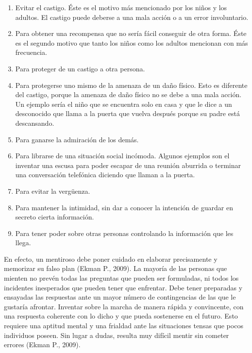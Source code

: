 \begin{enumerate}
\item Evitar el castigo. Éste es el motivo más mencionado por los niños y los adultos. El castigo puede deberse a una mala acción o a un error involuntario. 
\item Para obtener una recompensa que no sería fácil conseguir de otra forma. Éste es el segundo motivo que tanto los niños como los adultos mencionan con más frecuencia. 
\item Para proteger de un castigo a otra persona. 
\item Para protegerse uno mismo de la amenaza de un daño físico. Esto es diferente del castigo, porque la amenaza de daño físico no se debe a una mala acción. Un ejemplo sería el niño que se encuentra solo en casa y que le dice a un desconocido que llama a la puerta que vuelva después porque su padre está descansando. 
\item Para ganarse la admiración de los demás. 
\item Para librarse de una situación social incómoda. Algunos ejemplos son el inventar una escusa para poder escapar de una reunión aburrida o terminar una conversación telefónica diciendo que llaman a la puerta. 
\item Para evitar la vergüenza. 
\item Para mantener la intimidad, sin dar a  conocer la intención de guardar en secreto cierta información. 
\item Para tener poder sobre otras personas controlando la información que les llega.
\end{enumerate}

En efecto, un mentiroso debe poner cuidado en elaborar precisamente y memorizar su falso plan (Ekman P., 2009). La mayoría de las personas que mienten no prevén todas las preguntas que pueden ser formuladas, ni todos los incidentes inesperados que pueden tener que enfrentar. Debe tener preparadas y ensayadas las respuestas ante un mayor número de contingencias de las que le gustaría afrontar. Inventar sobre la marcha de manera rápida y convincente, con una respuesta coherente con lo dicho y que pueda sostenerse en el futuro. Esto requiere una aptitud mental y una frialdad ante las situaciones tensas que pocos individuos poseen. Sin lugar a dudas, resulta muy difícil mentir sin cometer errores (Ekman P., 2009).

